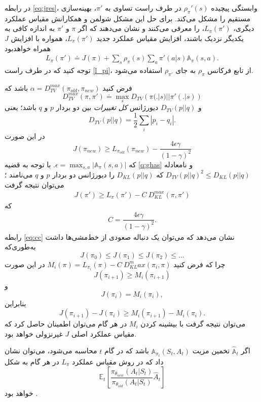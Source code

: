 در رابطه 
\ref{eq:jres}،
وابستگی پیچیده  $\rho_\pi'(s)$ در طرف راست تساوی به $\pi'$، بهینه‌سازی مستقیم را مشکل می‌کند.
برای حل این مشکل شولمن و همکارانش 
\cite{schulman2015trust}
مقیاس عملکرد دیگری، $L_\pi(\pi')$، را معرفی می‌کنند و نشان می‌دهند که اگر $\pi$ و $\pi'$ به اندازه کافی به یکدیگر نزدیک باشند، افزایش مقیاس عملکرد جدید $L_\pi(\pi')$، همواره با افزایش $J$ همراه خواهد‌بود
\begin{align}
L_\pi(\pi') \doteq J(\pi) + \sum_{s} \rho_{\pi}(s) \sum_{a} \pi'(a|s) \mathbb{A}_\pi(s,a).
\label{l_pi}
\end{align}
توجه کنید که در طرف راست 
\ref{l_pi}،
 از تابع فرکانس $\rho_\pi$ به جای 
 $\rho_{\pi'}$
استفاده می‌شود.

فرض کنید 
$\alpha = D_{TV}^{max}(\pi_{old}, \pi_{new})$
باشد که 
$$D_{TV}^{max} (\pi, \pi') \doteq \max_{s} D_{TV}\left(\pi(.|s) || \pi'(.|s)\right)$$
و 
$D_{TV}(p || q)$
دیورژانس 
\textit{کل تغییرات}
بین دو بردار $p$ و $q$ باشد؛ یعنی
$$D_{TV}(p || q) = \dfrac{1}{2} \sum_{i} |p_i - q_i|.$$ در این صورت
$$J(\pi_{new}) \ge L_{\pi_{old}}(\pi_{new}) - \dfrac{4 \epsilon \gamma}{(1- \gamma)^2}$$ که $\epsilon = \max_{s,a} |\mathbb{A}_\pi(s,a)|$.
\label{q:ghas}
با توجه به قضیه \ref{q:ghas} و نامعادله $D_{TV}(p || q)^2 \le D_{KL}(p || q)$  که  $D_{KL} (p || q)$ را دیورژانس
  دو بردار $p$ و $q$ می‌نامند
  \cite{schulman2015trust}؛
می‌توان  نتیجه گرفت
\begin{align*}
	J(\pi') \ge L_{\pi}(\pi') - C \ D_{KL}^{max}(\pi, \pi')
\end{align*}
که
\begin{align}
	C = \dfrac{4 \epsilon \gamma}{(1-\gamma)^2}.
	\label{eq:cc}
\end{align}
رابطه \ref{eq:cc} نشان می‌دهد که می‌توان یک دنباله صعودی از خط‌مشی‌ها داشت به‌طوری‌که
$$J(\pi_0) \le J(\pi_1) \le J(\pi_2) \le ... $$
چرا که فرض کنید
$M_i(\pi) = L_{\pi_i}(\pi) - C \ D_{KL}^max(\pi_i, \pi)$
در این صورت
 $$J(\pi_{i+1}) \ge M_i(\pi_{i+1}) $$ 
 و
$$J(\pi_i) = M_i(\pi_i),$$
بنابراین
$$J(\pi_{i+1}) - J(\pi_i) \ge M_i(\pi_{i+1}) - M_i(\pi_i).$$
می‌توان نتیجه گرفت با بیشینه کردن $M_i$ در هر گام می‌توان اطمینان حاصل کرد که مقیاس عملکرد اصلی $J$ غیرنزولی خواهد بود.

اگر $\hat{\mathbb{A}}_t$ تخمین مزیت 
$\mathbb{A}_{\pi_t}(S_t, A_t)$
باشد که در گام $t$ محاسبه می‌شود، می‌توان نشان داد که در روش
مقیاس عملکرد $L_\pi$ در هر گام به شکل
$$\mathbb{E}_t\left[\dfrac{\pi_{\theta_{new}}(A_t| S_t)}{\pi_{\theta_{old}}(A_t|S_t)} \hat{A}_t \right]$$خواهد بود
\cite{schulman2015trust}.

